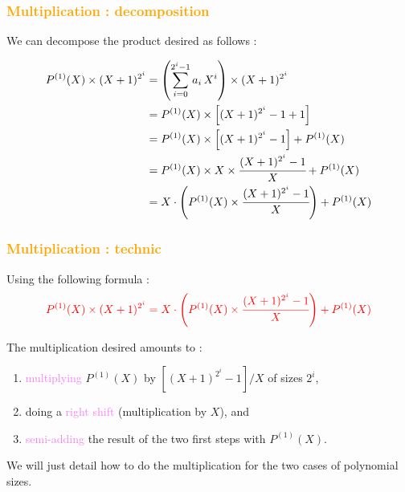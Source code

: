 \begin{frame}[fragile]
\frametitle{\textbf{\textcolor{orange}{Multiplication : decomposition}}}

We can decompose the product desired as follows :

\begin{block}{}
\footnotesize
\begin{align*}
P^{(1)}(X) \times (X+1)^{2^i} 
&= \left( \sum_{i=0}^{2^i-1} a_i\,X^i\right) \times (X+1)^{2^i}\\
&= P^{(1)}(X) \times \left[(X+1)^{2^i} - 1 + 1 \right]\\
&= P^{(1)}(X) \times \left[(X+1)^{2^i} - 1\right] + P^{(1)}(X)\\
&= P^{(1)}(X) \times X \times \cfrac{(X+1)^{2^i} - 1}{X} + P^{(1)}(X)\\
&= X \cdot \left( P^{(1)}(X) \times \cfrac{(X+1)^{2^i} - 1}{X} \right) + P^{(1)}(X)
\end{align*}
\end{block}

\end{frame}

\begin{frame}[fragile]
\frametitle{\textbf{\textcolor{orange}{Multiplication : technic}}}
\begin{tsmc}
Using the following formula :
$$\textcolor{red}{P^{(1)}(X) \times (X+1)^{2^i}  = X \cdot \left( P^{(1)}(X) \times \cfrac{(X+1)^{2^i} - 1}{X} \right) + P^{(1)}(X)}$$

The multiplication desired amounts to :

\begin{enumerate}
\item \textcolor{violet}{multiplying} $P^{(1)}(X)$ by $[(X+1)^{2^i} - 1]/X$ of sizes $2^i$,
\item doing a \textcolor{violet}{right shift} (multiplication by $X$), and
\item \textcolor{violet}{semi-adding} the result of the two first steps with $P^{(1)}(X)$.
\end{enumerate}
\end{tsmc}

We will just detail how to do the multiplication for the two cases of polynomial sizes.

\end{frame}

